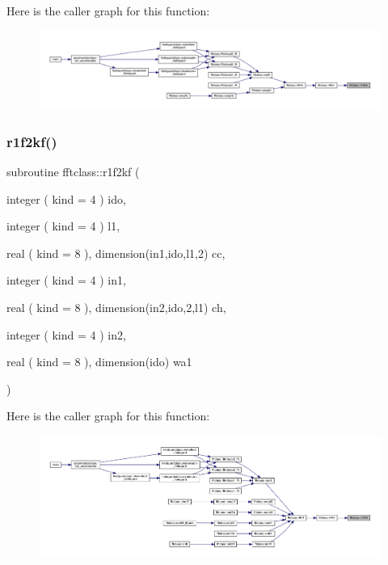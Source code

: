 Here is the caller graph for this function\+:\nopagebreak
\begin{figure}[H]
\begin{center}
\leavevmode
\includegraphics[width=350pt]{namespacefftclass_a6cf75b3c3c340adb4eb40e50289cf439_icgraph}
\end{center}
\end{figure}
\mbox{\label{namespacefftclass_a9d3bdd521a616fe934704cb38ac074f4}} 
\subsubsection{\texorpdfstring{r1f2kf()}{r1f2kf()}}
{\footnotesize\ttfamily subroutine fftclass\+::r1f2kf (\begin{DoxyParamCaption}\item[{integer ( kind = 4 )}]{ido,  }\item[{integer ( kind = 4 )}]{l1,  }\item[{real ( kind = 8 ), dimension(in1,ido,l1,2)}]{cc,  }\item[{integer ( kind = 4 )}]{in1,  }\item[{real ( kind = 8 ), dimension(in2,ido,2,l1)}]{ch,  }\item[{integer ( kind = 4 )}]{in2,  }\item[{real ( kind = 8 ), dimension(ido)}]{wa1 }\end{DoxyParamCaption})}

Here is the caller graph for this function\+:\nopagebreak
\begin{figure}[H]
\begin{center}
\leavevmode
\includegraphics[width=350pt]{namespacefftclass_a9d3bdd521a616fe934704cb38ac074f4_icgraph}
\end{center}
\end{figure}
\mbox{\label{namespacefftclass_ad450dc5bf08d49d4784e609c41b42950}} 
